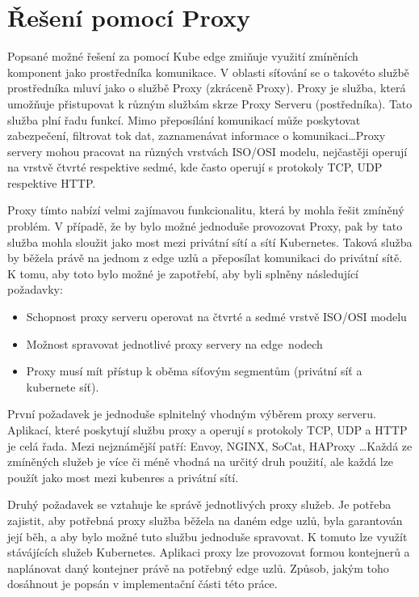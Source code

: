 \section{Řešení pomocí Proxy}\label{sec:req}
Popsané možné řešení za pomocí Kube edge zmiňuje využití zmíněních komponent jako prostředníka komunikace. V oblasti síťování se o takovéto službě prostředníka mluví jako o službě Proxy (zkráceně Proxy). Proxy je služba, která umožňuje přistupovat k různým službám skrze Proxy Serveru (postředníka). Tato služba plní řadu funkcí. Mimo přeposílání komunikací může poskytovat zabezpečení, filtrovat tok dat, zaznamenávat informace o komunikaci\ldots Proxy servery mohou pracovat na různých vrstvách ISO/OSI modelu, nejčastěji operují na vrstvě čtvrté respektive sedmé, kde často operují s protokoly TCP, UDP respektive HTTP.

Proxy tímto nabízí velmi zajímavou funkcionalitu, která by mohla řešit zmíněný problém. V případě, že by bylo možné jednoduše provozovat Proxy, pak by tato služba mohla sloužit jako most mezi privátní sítí a sítí Kubernetes. Taková služba by běžela právě na jednom z edge uzlů a přeposílat komunikaci do privátní sítě. K tomu, aby toto bylo možné je zapotřebí, aby byli splněny následující požadavky:

\begin{itemize}
    \item Schopnost proxy serveru operovat na čtvrté a sedmé vrstvě ISO/OSI modelu
    \item Možnost spravovat jednotlivé proxy servery na edge~nodech
    \item Proxy musí mít přístup k oběma síťovým segmentům (privátní síť a kubernete síť).
\end{itemize}

První požadavek je jednoduše splnitelný vhodným výběrem proxy serveru. Aplikací, které poskytují službu proxy a operují s protokoly TCP, UDP a HTTP je celá řada. Mezi nejznámější patří: Envoy, NGINX, SoCat, HAProxy \ldots Každá ze zmíněných služeb je více či méně vhodná na určitý druh použití, ale každá lze použít jako most mezi kubenres a privátní sítí.

Druhý požadavek se vztahuje ke správě jednotlivých proxy služeb. Je potřeba zajistit, aby potřebná proxy služba běžela na daném edge uzlů, byla garantován její běh, a aby bylo možné tuto službu jednoduše spravovat. K tomuto lze využít stávájících služeb Kubernetes. Aplikaci proxy lze provozovat formou kontejnerů a naplánovat daný kontejner právě na potřebný edge uzlů. Způsob, jakým toho dosáhnout je popsán v implementační části této práce.  


